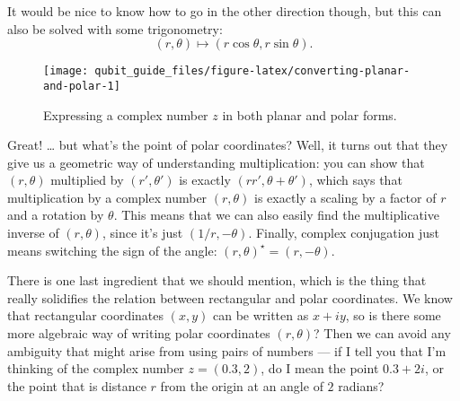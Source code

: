\documentclass[fleqn]{article}
\renewcommand{\footnote}[1]{\en{#1}}
\begin{document}
It would be nice to know how to go in the other direction though, but this can also be solved with some trigonometry:
\[
  (r,\theta)
  \longmapsto (r\cos\theta,r\sin\theta).
\]



\begin{figure}[H]

{\centering \texttt{[image: qubit\_guide\_files/figure-latex/converting-planar-and-polar-1]} 

}

\caption{Expressing a complex number \(z\) in both planar and polar forms.}\label{fig:converting-planar-and-polar}
\end{figure}

Great!
\ldots{} but what's the point of polar coordinates?
Well, it turns out that they give us a geometric way of understanding multiplication: you can show\footnote{\textbf{Exercise.} Prove this!} that \((r,\theta)\) multiplied by \((r',\theta')\) is exactly \((rr',\theta+\theta')\), which says that multiplication by a complex number \((r,\theta)\) is exactly a scaling by a factor of \(r\) and a rotation by \(\theta\).
This means that we can also easily find the multiplicative inverse of \((r,\theta)\), since it's just \((1/r,-\theta)\).
Finally, complex conjugation just means switching the sign of the angle: \((r,\theta)^\star=(r,-\theta)\).

There is one last ingredient that we should mention, which is the thing that really solidifies the relation between rectangular and polar coordinates.
We know that rectangular coordinates \((x,y)\) can be written as \(x+iy\), so is there some more algebraic way of writing polar coordinates \((r,\theta)\)?
Then we can avoid any ambiguity that might arise from using pairs of numbers --- if I tell you that I'm thinking of the complex number \(z=(0.3,2)\), do I mean the point \(0.3+2i\), or the point that is distance \(r\) from the origin at an angle of \(2\) radians?
\end{document}
